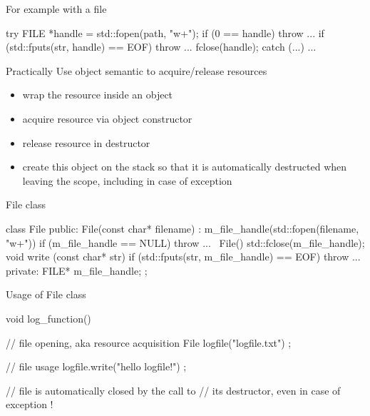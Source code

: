 \begin{frame}[fragile]
  \begin{exampleblock}{For example with a file}
    \begin{cppcode*}{}
      try {
        FILE *handle = std::fopen(path, "w+");
        if (0 == handle) { throw ... }
        if (std::fputs(str, handle) == EOF) {
          throw ...
        }
        fclose(handle);
      } catch (...) { ... }
    \end{cppcode*}
  \end{exampleblock}
\end{frame}

\begin{frame}
  \begin{block}{Practically}
    Use object semantic to acquire/release resources
    \begin{itemize}
    \item wrap the resource inside an object
    \item acquire resource via object constructor
    \item release resource in destructor
    \item create this object on the stack so that it is automatically destructed when leaving the scope, including in case of exception
    \end{itemize}
  \end{block}
\end{frame}

\begin{frame}[fragile]
  \begin{exampleblock}{File class}
    \begin{cppcode*}{}
      class File {
      public:
        File(const char* filename) :
          m_file_handle(std::fopen(filename, "w+")) {
          if (m_file_handle == NULL) { throw ... }
        }
        ~File() { std::fclose(m_file_handle); }
        void write (const char* str) {
          if (std::fputs(str, m_file_handle) == EOF) {
            throw ...
          }
        }
      private:
        FILE* m_file_handle;
      };
    \end{cppcode*}
  \end{exampleblock}
\end{frame}

\begin{frame}[fragile]
  \begin{exampleblock}{Usage of File class}
    \begin{cppcode*}{}
      void log_function() {
        // file opening, aka resource acquisition
        File logfile("logfile.txt") ;

        // file usage
        logfile.write("hello logfile!") ;

        // file is automatically closed by the call to
        // its destructor, even in case of exception !
      }
    \end{cppcode*}
  \end{exampleblock}
\end{frame}

